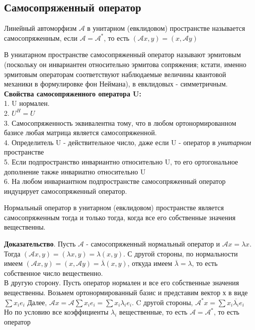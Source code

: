 \subsection{Самосопряженный оператор}
\begin{defin}
Линейный автоморфизм $\mathcal A$ в унитарном (евклидовом) пространстве 
называется самосопряженным, если $\mathcal A=\mathcal A^*$, то есть
$(\mathcal Ax,y)=(x,\mathcal Ay)$
\end{defin}
В униатарном пространстве самосопряженный оператор называют эрмитовым 
(поскольку он инвариантен относительно эрмитова сопряжения; кстати, именно 
эрмитовым операторам соответствуют наблюдаемые величины квантовой механики в
формулировке фон Неймана), в евклидовых - симметричным.\\
\textbf{Свойства самосопряженного оператора U:}\\
1. U нормален.\\
2. $U^H=U$\\
3. Самосопряженность эквивалентна тому, что в любом ортонормированном базисе
любая матрица является самосопряженной.\\
4. Определитель U - действительное число, даже если U - оператор в 
\textit{унитарном} пространстве\\
5. Если подпространство инвариантно относительно U, то его ортогональное 
дополнение также инвариатно относительно U\\
6. На любом инвариантном подпространстве самосопряженный оператор индуцирует 
самосопряженный оператор. 
\begin{theor}
Нормальный оператор в унитарном (евклидовом) пространстве является 
самосопряженным тогда и только тогда, когда все его собственные значения
вещественны. 
\end{theor}
\textbf{Доказательство}. 
Пусть $\mathcal A$ - самосопряженный нормальный оператор и
$\mathcal Ax=\lambda x$. Тогда $(\mathcal Ax,y)=(\lambda x,y)=\lambda(x,y)$.
С другой стороны, по нормальности имеем $(\mathcal Ax,y)=(x,\mathcal
Ay)=\overline{\lambda}(x,y)$, откуда имеем $\overline{\lambda}=\lambda$, то
есть собственное число вещественно. \\
В другую сторону. Пусть оператор нормален и все его собственные значения 
вещественны. Возьмем
ортонормированный базис и представим вектор х в виде $\sum x_ie_i$  Далее,
$\mathcal Ax=\mathcal A\sum x_ie_i=\sum x_i\lambda_ie_i$.  C другой стороны,
$\mathcal A^*x=\sum x_i\overline{\lambda_i}e_i$ Но по условию все коэффициенты
$\lambda_i$ вещественные, то есть $\mathcal A=\mathcal A^*$, то есть оператор 
